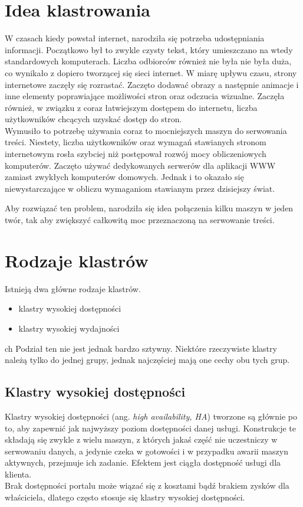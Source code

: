 \section{Idea klastrowania}
W czasach kiedy powstał internet, narodziła się potrzeba udostępniania informacji. Początkowo był to zwykle czysty tekst, który umieszczano na wtedy standardowych komputerach. Liczba odbiorców również nie była nie była duża, co wynikało z dopiero tworzącej się sieci internet.
W miarę upływu czasu, strony internetowe zaczęły się rozrastać. Zaczęto dodawać obrazy a następnie animacje i inne elementy poprawiające możliwości stron oraz odczucia wizualne. Zaczęła również, w związku z coraz łatwiejszym dostępem do internetu, liczba użytkowników chcących uzyskać dostęp do stron.\\
Wymusiło to potrzebę używania coraz to mocniejszych maszyn do serwowania treści. Niestety, liczba użytkowników oraz wymagań stawianych stronom internetowym rosła szybciej niż postępował rozwój mocy obliczeniowych komputerów. Zaczęto używać dedykowanych serwerów dla aplikacji WWW zamiast zwykłych komputerów domowych. Jednak i to okazało się niewystarczające w obliczu wymaganiom stawianym przez dzisiejszy świat.

Aby rozwiązać ten problem, narodziła się idea połączenia kilku maszyn w jeden twór, tak aby zwiększyć całkowitą moc przeznaczoną na serwowanie treści.
\section{Rodzaje klastrów}
Istnieją dwa główne rodzaje klastrów.
\begin{itemize}
\item klastry wysokiej dostępności
\item klastry wysokiej wydajności
\end{itemize}ch 
Podział ten nie jest jednak bardzo sztywny.
Niektóre rzeczywiste klastry należą tylko do jednej grupy, jednak najczęściej mają one cechy obu tych grup.
\subsection{Klastry wysokiej dostępności}
Klastry wysokiej dostępności (ang. \textit{high availability, HA}) tworzone są głównie po to, aby zapewnić jak najwyższy poziom dostępności danej usługi.
Konstrukcje te składają się zwykle z wielu maszyn, z których jakaś część nie uczestniczy w serwowaniu danych, a jedynie czeka w gotowości i w przypadku awarii maszyn aktywnych, przejmuje ich zadanie. Efektem jest ciągła dostępność usługi dla klienta.\\
Brak dostępności portalu może wiązać się z kosztami bądź brakiem zysków dla właściciela, dlatego często stosuje się klastry wysokiej dostępności.
